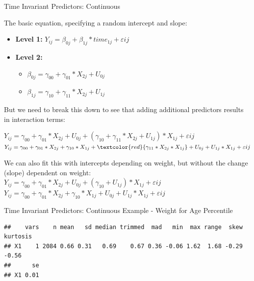 \begin{frame}{Time Invariant Predictors: Continuous}

The basic equation, specifying a random intercept and slope:\\

\begin{itemize}
  \item \textbf{Level 1:} $Y_{ij} = \beta_{0j} + \beta_{1j}*time_{1j} + \varepsilon{ij}$
  \item \textbf{Level 2:} 
    \begin{itemize} 
      \item $\beta_{0j} = \gamma_{00} + \gamma_{01}*X_{2j} + U_{0j}$
      \item $\beta_{1j} = \gamma_{10} + \gamma_{11}*X_{2j} + U_{1j}$
    \end{itemize}
\end{itemize}

But we need to break this down to see that adding additional predictors
results in interaction terms:

\(Y_{ij} = \gamma_{00} + \gamma_{01}*X_{2j} + U_{0j} + (\gamma_{10} + \gamma_{11}*X_{2j} + U_{1j})*X_{1j} + \varepsilon{ij}\)
\(Y_{ij} = \gamma_{00} + \gamma_{01}*X_{2j} + \gamma_{10}*X_{1j} + \textcolor{red}{\gamma_{11}*X_{2j}*X_{1j}} + U_{0j} + U_{1j}*X_{1j} + \varepsilon{ij}\)

We can also fit this with intercepts depending on weight, but without
the change (slope) dependent on weight:\\
\(Y_{ij} = \gamma_{00} + \gamma_{01}*X_{2j} + U_{0j} + (\gamma_{10} + U_{1j})*X_{1j} + \varepsilon{ij}\)
\(Y_{ij} = \gamma_{00} + \gamma_{01}*X_{2j} + \gamma_{10}*X_{1j} + U_{0j} + U_{1j}*X_{1j} + \varepsilon{ij}\)

\end{frame}

\begin{frame}[fragile]{Time Invariant Predictors: Continuous Example -
Weight for Age Percentile}

\begin{Shaded}
\begin{Highlighting}[]
\OperatorTok{$}
\end{Highlighting}
\end{Shaded}

\footnotesize

\begin{verbatim}
##    vars    n mean   sd median trimmed  mad   min  max range  skew kurtosis
## X1    1 2084 0.66 0.31   0.69    0.67 0.36 -0.06 1.62  1.68 -0.29    -0.56
##      se
## X1 0.01
\end{verbatim}

\normalsize

\end{frame}

